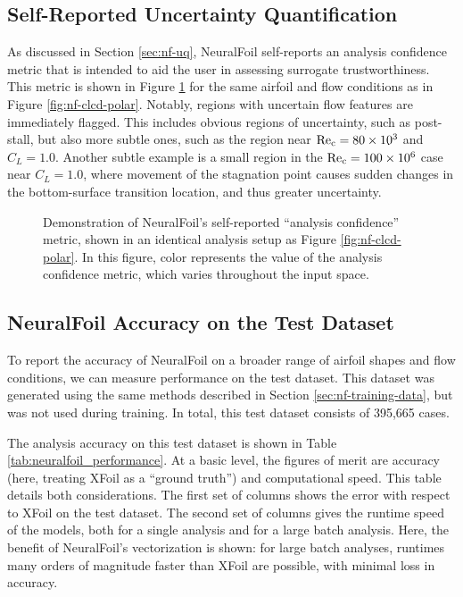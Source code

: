     \subsection{Self-Reported Uncertainty Quantification}
    \label{sec:nf-uq-results}

    As discussed in Section \ref{sec:nf-uq}, NeuralFoil self-reports an analysis confidence metric that is intended to aid the user in assessing surrogate trustworthiness. This metric is shown in Figure \ref{fig:clcd_polar_with_uq} for the same airfoil and flow conditions as in Figure \ref{fig:nf-clcd-polar}. Notably, regions with uncertain flow features are immediately flagged. This includes obvious regions of uncertainty, such as post-stall, but also more subtle ones, such as the region near $\rm Re_c=80 \times 10^3$ and $C_L=1.0$. Another subtle example is a small region in the $\rm Re_c=100 \times 10^6$ case near $C_L=1.0$, where movement of the stagnation point causes sudden changes in the bottom-surface transition location, and thus greater uncertainty.

    \begin{figure}[H]
        \centering
        
        \caption{Demonstration of NeuralFoil's self-reported ``analysis confidence'' metric, shown in an identical analysis setup as Figure \ref{fig:nf-clcd-polar}. In this figure, color represents the value of the analysis confidence metric, which varies throughout the input space.}
        \label{fig:clcd_polar_with_uq}
    \end{figure}

    \subsection{NeuralFoil Accuracy on the Test Dataset}

    To report the accuracy of NeuralFoil on a broader range of airfoil shapes and flow conditions, we can measure performance on the test dataset. This dataset was generated using the same methods described in Section \ref{sec:nf-training-data}, but was not used during training. In total, this test dataset consists of 395,665 cases.

    The analysis accuracy on this test dataset is shown in Table \ref{tab:neuralfoil_performance}. At a basic level, the figures of merit are accuracy (here, treating XFoil as a ``ground truth'') and computational speed. This table details both considerations. The first set of columns shows the error with respect to XFoil on the test dataset. The second set of columns gives the runtime speed of the models, both for a single analysis and for a large batch analysis. Here, the benefit of NeuralFoil's vectorization is shown: for large batch analyses, runtimes many orders of magnitude faster than XFoil are possible, with minimal loss in accuracy.

